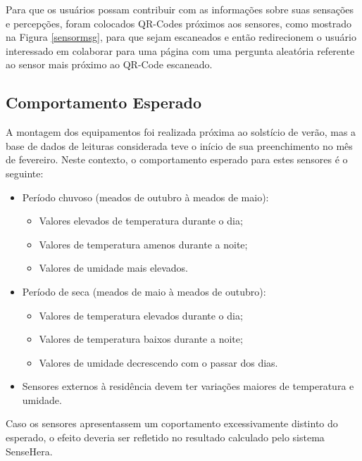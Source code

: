 \newpage
Para que os usuários possam contribuir com as informações sobre suas sensações e percepções, foram colocados QR-Codes próximos aos sensores, como mostrado na Figura \ref{sensormsg}, para que sejam escaneados e então redirecionem o usuário interessado em colaborar para uma página com uma pergunta aleatória referente ao sensor mais próximo ao QR-Code escaneado.


\subsection{Comportamento Esperado}
\quad A montagem dos equipamentos foi realizada próxima ao solstício de verão, mas a base de dados de leituras considerada teve o início de sua preenchimento no mês de fevereiro. Neste contexto, o comportamento esperado para estes sensores é o seguinte:
\begin{itemize}
  \item Período chuvoso (meados de outubro à meados de maio):
  \begin{itemize}
    \item Valores elevados de temperatura durante o dia;
    \item Valores de temperatura amenos durante a noite;
    \item Valores de umidade mais elevados.

  \end{itemize}
  \item Período de seca (meados de maio à meados de outubro):
  \begin{itemize}
    \item Valores de temperatura elevados durante o dia;
    \item Valores de temperatura baixos durante a noite;
    \item Valores de umidade decrescendo com o passar dos dias.
  \end{itemize}
  \item Sensores externos à residência devem ter variações maiores de temperatura e umidade.
\end{itemize}
\null \quad Caso os sensores apresentassem um coportamento excessivamente distinto do esperado, o efeito deveria ser refletido no resultado calculado pelo sistema SenseHera.

